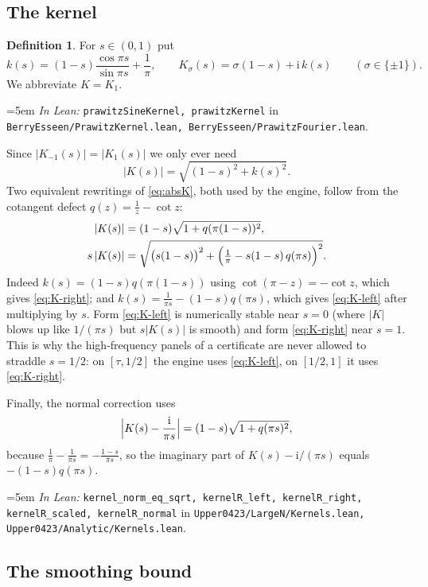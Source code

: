 \documentclass[11pt,a4paper]{article}
\theoremstyle{definition}
\newtheorem{definition}[theorem]{Definition}
\newcommand{\ii}{\mathrm{i}}
\newcommand{\Lean}[1]{\texttt{#1}}
\newcommand{\file}[1]{\texttt{#1}}
\newcommand{\formal}[2]{%
  \par\smallskip
  \begingroup\small\raggedright\emergencystretch=5em
  \noindent\textit{In Lean:} \Lean{#1} in \file{#2}.\par
  \endgroup\smallskip}
\begin{document}
\subsection{The kernel}

\begin{definition}
  \label{def:kernel}
  For $s\in(0,1)$ put
  \[
    k(s)=(1-s)\frac{\cos\pi s}{\sin\pi s}+\frac1\pi,
    \qquad
    K_\sigma(s)=\sigma(1-s)+\ii\,k(s)\qquad(\sigma\in\{\pm1\}) .
  \]
  We abbreviate $K=K_1$.
\end{definition}
\formal{prawitzSineKernel, prawitzKernel}{BerryEsseen/PrawitzKernel.lean, BerryEsseen/PrawitzFourier.lean}

\noindent Since $|K_{-1}(s)|=|K_1(s)|$ we only ever need
\begin{equation}
  \label{eq:absK}
  |K(s)|=\sqrt{(1-s)^2+k(s)^2} .
\end{equation}
Two equivalent rewritings of \eqref{eq:absK}, both used by the engine, follow
from the cotangent defect $q(z)=\tfrac1z-\cot z$:
\begin{align}
  \label{eq:K-right}
  |K(s)| &= (1-s)\sqrt{1+q(\pi(1-s))^2},\\
  \label{eq:K-left}
  s\,|K(s)| &= \sqrt{\bigl(s(1-s)\bigr)^2+\Bigl(\tfrac1\pi-s(1-s)\,q(\pi s)\Bigr)^2} .
\end{align}
Indeed $k(s)=(1-s)q(\pi(1-s))$ using $\cot(\pi-z)=-\cot z$, which gives
\eqref{eq:K-right}; and $k(s)=\tfrac1{\pi s}-(1-s)q(\pi s)$, which gives
\eqref{eq:K-left} after multiplying by $s$. Form \eqref{eq:K-left} is
numerically stable near $s=0$ (where $|K|$ blows up like $1/(\pi s)$ but
$s|K(s)|$ is smooth) and form \eqref{eq:K-right} near $s=1$. This is why the
high-frequency panels of a certificate are never allowed to straddle $s=1/2$: on
$[\tau,1/2]$ the engine uses \eqref{eq:K-left}, on $[1/2,1]$ it uses
\eqref{eq:K-right}.

Finally, the normal correction uses
\begin{equation}
  \label{eq:K-normal}
  \Bigl|K(s)-\frac{\ii}{\pi s}\Bigr| = (1-s)\sqrt{1+q(\pi s)^2},
\end{equation}
because $\tfrac1\pi-\tfrac1{\pi s}=-\tfrac{1-s}{\pi s}$, so the imaginary part of
$K(s)-\ii/(\pi s)$ equals $-(1-s)q(\pi s)$.
\formal{kernel\_norm\_eq\_sqrt, kernelR\_left, kernelR\_right, kernelR\_scaled, kernelR\_normal}{Upper0423/LargeN/Kernels.lean, Upper0423/Analytic/Kernels.lean}

\subsection{The smoothing bound}
\end{document}
